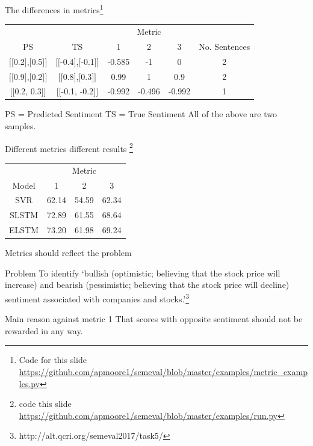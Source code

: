 \documentclass[10pt]{beamer}
\begin{document}
\begin{frame}[fragile]{The differences in metrics\footnote{Code for this slide \url{https://github.com/apmoore1/semeval/blob/master/examples/metric_examples.py}}}
\begin{table}[c]
\centering
\label{my-label}
\begin{tabular}{cccccc}
 \multicolumn{2}{c}{} & \multicolumn{3}{c}{Metric} & \multicolumn{1}{c}{} \\
 \cmidrule(lr){3-5} 
 PS& TS&  1&  2&  3& No. Sentences\\
 $[$$[$0.2$]$,$[$0.5$]$$]$&  $[$$[$-0.4$]$,$[$-0.1$]$$]$&  -0.585&  -1&  0&  2\\
$[$$[$0.9$]$,$[$0.2$]$$]$&  $[$$[$0.8$]$,$[$0.3$]$$]$&  0.99&  1&  0.9&  2\\
 $[$$[$0.2, 0.3$]$$]$&  $[$$[$-0.1, -0.2$]$$]$&  -0.992&  -0.496&  -0.992& 1
\end{tabular}
\end{table}
PS = Predicted Sentiment \newline
TS = True Sentiment \newline \newline
All of the above are two samples.

\end{frame}

\begin{frame}[fragile]{Different metrics different results \footnote{code this slide \url{https://github.com/apmoore1/semeval/blob/master/examples/run.py}}}
\begin{table}[c]
\centering
\begin{tabular}{cccc}
 \multicolumn{1}{c}{} & \multicolumn{3}{c}{Metric} \\
 Model&  1&  2&  3 \\
 SVR&  62.14&  54.59&  62.34 \\
 SLSTM&  72.89&  61.55&  68.64 \\
 ELSTM&  73.20&  61.98&  69.24 
 
\end{tabular}
\end{table}
\end{frame}

\begin{frame}[fragile]{Metrics should reflect the problem}
\begin{block}{Problem}
To identify `bullish (optimistic; believing that the stock price will increase) and bearish (pessimistic; believing that the stock price will decline) sentiment associated with companies and stocks.'\footnote{http://alt.qcri.org/semeval2017/task5/}
\end{block}

\begin{block}{Main reason against metric 1}
That scores with opposite sentiment should not be rewarded in any way.
\end{block}

\end{frame}
\end{document}
